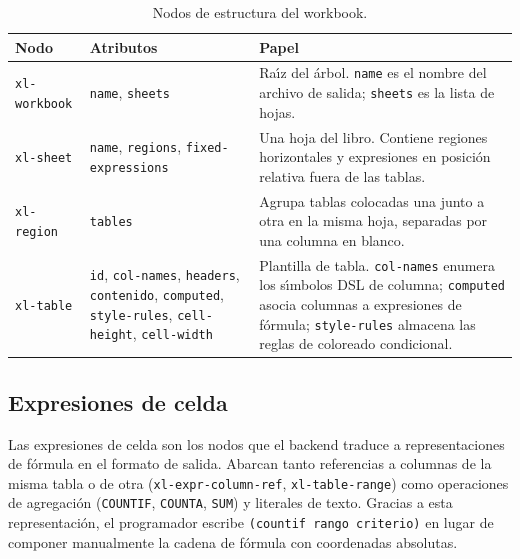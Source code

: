\begin{table}[h!]
\centering
\caption{Nodos de estructura del workbook.}
\label{tab:ast-estructura}
\renewcommand{\arraystretch}{1.3}
\begin{tabular}{p{3.6cm} p{4.8cm} p{5.4cm}}
\toprule
\textbf{Nodo} & \textbf{Atributos} & \textbf{Papel} \\
\midrule
\texttt{xl-workbook}
  & \texttt{name}, \texttt{sheets}
  & Ra\'{\i}z del \'arbol.  \texttt{name} es el nombre del
    archivo de salida; \texttt{sheets} es la lista de hojas. \\
\midrule
\texttt{xl-sheet}
  & \texttt{name}, \texttt{regions},\newline
    \texttt{fixed-expressions}
  & Una hoja del libro.  Contiene regiones horizontales y
    expresiones en posici\'on relativa fuera de las tablas. \\
\midrule
\texttt{xl-region}
  & \texttt{tables}
  & Agrupa tablas colocadas una junto a otra en la misma
    hoja, separadas por una columna en blanco. \\
\midrule
\texttt{xl-table}
  & \texttt{id}, \texttt{col-names},\newline
    \texttt{headers}, \texttt{contenido},\newline
    \texttt{computed}, \texttt{style-rules},\newline
    \texttt{cell-height}, \texttt{cell-width}
  & Plantilla de tabla.  \texttt{col-names} enumera los
    s\'{\i}mbolos DSL de columna; \texttt{computed} asocia
    columnas a expresiones de f\'ormula; \texttt{style-rules}
    almacena las reglas de coloreado condicional. \\
\bottomrule
\end{tabular}
\end{table}

\subsection{Expresiones de celda}
\label{sec:ast-expresiones}

Las expresiones de celda son los nodos que el backend traduce a
representaciones de f\'ormula en el formato de salida.  Abarcan tanto
referencias a columnas de la misma tabla o de otra (\texttt{xl-expr-column-ref},
\texttt{xl-table-range}) como operaciones de agregaci\'on (\texttt{COUNTIF},
\texttt{COUNTA}, \texttt{SUM}) y literales de texto.  Gracias a esta
representaci\'on, el programador escribe \texttt{(countif rango criterio)}
en lugar de componer manualmente la cadena de f\'ormula con coordenadas
absolutas.

